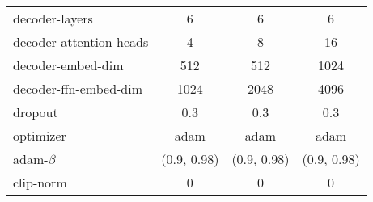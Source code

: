 \documentclass{article} %
\begin{document}
\begin{table}[h]
\begin{tabular}{lccc}
decoder-layers          & 6                                                                                           & 6                                                                                    & 6                                                                                   \\
decoder-attention-heads & 4                                                                                           & 8                                                                                    & 16                                                                                   \\
decoder-embed-dim       & 512                                                                                         & 512                                                                                  & 1024                                                                                \\
decoder-ffn-embed-dim   & 1024                                                                                        & 2048                                                                                 & 4096                                                                                \\
dropout                 & 0.3                                                                                         & 0.3                                                                                  & 0.3                                                                                 \\
optimizer               & adam                                                                                        & adam                                                                                 & adam                                                                                \\
adam-$\beta$                  & (0.9, 0.98)                                                                                 & (0.9, 0.98)                                                                          & (0.9, 0.98)                                                                         \\
clip-norm               & 0                                                                                           & 0                                                                                    & 0                                                                                   \\

\end{tabular}
\end{table}
\end{document}
